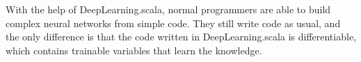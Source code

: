 With the help of DeepLearning.scala, normal programmers are able to build complex neural networks from simple code. They still write code as usual, and the only difference is that the code written in DeepLearning.scala is differentiable, which contains \glspl{trainable variable} that learn the knowledge.

\appendix

\printglossary

\begin{acks}
\end{acks}

\clearpage


